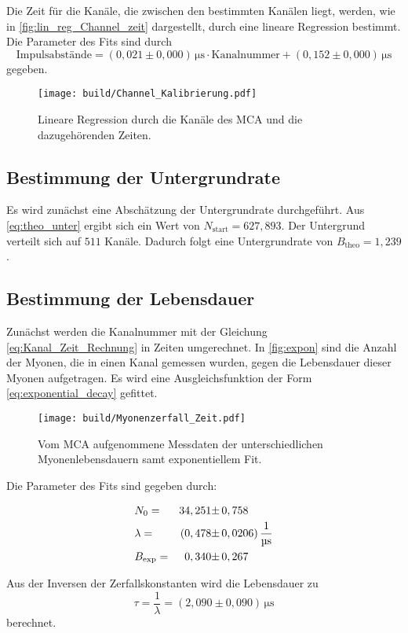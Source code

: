 Die Zeit für die Kanäle, die zwischen den bestimmten Kanälen liegt, werden, wie in \autoref{fig:lin_reg_Channel_zeit} dargestellt, durch eine lineare Regression bestimmt.
Die Parameter des Fits sind durch 
\begin{equation}
    \text{Impulsabstände} = \left(0,021 \pm 0,000 \right) \,\unit{\micro\second} \cdot  \text{Kanalnummer} + \left(0,152 \pm 0,000 \right) \,\unit{\micro\second}
    \label{eq:Kanal_Zeit_Rechnung}
\end{equation}
gegeben.

\begin{figure}[H]
    \centering
    \texttt{[image: build/Channel\_Kalibrierung.pdf]}
    \caption{Lineare Regression durch die Kanäle des MCA und die dazugehörenden Zeiten.}
    \label{fig:lin_reg_Channel_zeit}
\end{figure}

\subsection{Bestimmung der Untergrundrate}
\label{sec:Bes_Unt}
Es wird zunächst eine Abschätzung der Untergrundrate durchgeführt. Aus \eqref{eq:theo_unter} ergibt sich ein Wert von $N_\text{start} = 627,893$.
Der Untergrund verteilt sich auf $511$ Kanäle. Dadurch folgt eine Untergrundrate von $B_\text{theo} = 1,239$. %


\subsection{Bestimmung der Lebensdauer}
\label{sec:Bes_Leb}

Zunächst werden die Kanalnummer mit der Gleichung \eqref{eq:Kanal_Zeit_Rechnung} in Zeiten umgerechnet.
In \autoref{fig:expon} sind die Anzahl der Myonen, die in einen Kanal gemessen wurden, gegen die Lebensdauer dieser Myonen aufgetragen.
Es wird eine Ausgleichsfunktion der Form \eqref{eq:exponential_decay} gefittet.

\begin{figure}[H]
    \centering
    \texttt{[image: build/Myonenzerfall\_Zeit.pdf]}
    \caption{Vom MCA aufgenommene Messdaten der unterschiedlichen Myonenlebensdauern samt exponentiellem Fit.}
    \label{fig:expon}
\end{figure}

Die Parameter des Fits sind gegeben durch:

\begin{align*}
    &N_0                      =& 34,251 \pm& \, 0,758                                 \\
    &\lambda            	  =& (0,478 \pm& \, 0,0206)  \, \unit{\dfrac{1}{\micro\second}} \\
    &B_{\text{exp}}           =& 0,340  \pm& \, 0,267
\end{align*}

Aus der Inversen der Zerfallskonstanten wird die Lebensdauer zu 
\begin{equation*}
    \tau = \dfrac{1}{\lambda} = \left(2,090  \pm 0,090 \right) \,\unit{\micro\second}
\end{equation*}
berechnet.
